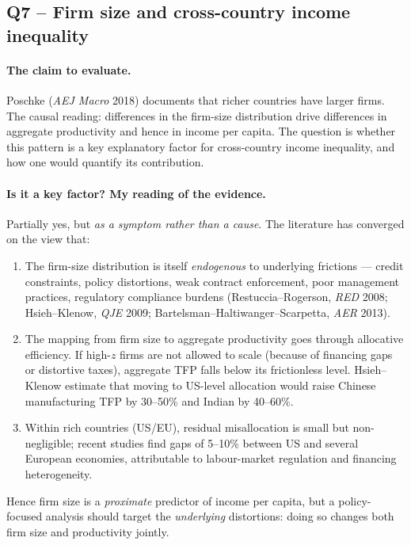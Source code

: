 \documentclass[11pt,a4paper]{article}
\begin{document}
\subsection*{Q7 -- Firm size and cross-country income inequality}

\paragraph{The claim to evaluate.}
Poschke (\emph{AEJ Macro} 2018) documents that richer countries have larger firms. The causal reading: differences in the firm-size distribution drive differences in aggregate productivity and hence in income per capita. The question is whether this pattern is a key explanatory factor for cross-country income inequality, and how one would quantify its contribution.

\paragraph{Is it a key factor? My reading of the evidence.}
Partially yes, but \emph{as a symptom rather than a cause}. The literature has converged on the view that:
\begin{enumerate}[leftmargin=*,itemsep=1pt]
    \item The firm-size distribution is itself \emph{endogenous} to underlying frictions --- credit constraints, policy distortions, weak contract enforcement, poor management practices, regulatory compliance burdens (Restuccia--Rogerson, \emph{RED} 2008; Hsieh--Klenow, \emph{QJE} 2009; Bartelsman--Haltiwanger--Scarpetta, \emph{AER} 2013).
    \item The mapping from firm size to aggregate productivity goes through allocative efficiency. If high-$z$ firms are not allowed to scale (because of financing gaps or distortive taxes), aggregate TFP falls below its frictionless level. Hsieh--Klenow estimate that moving to US-level allocation would raise Chinese manufacturing TFP by 30--50\% and Indian by 40--60\%.
    \item Within rich countries (US/EU), residual misallocation is small but non-negligible; recent studies find gaps of 5--10\% between US and several European economies, attributable to labour-market regulation and financing heterogeneity.
\end{enumerate}
Hence firm size is a \emph{proximate} predictor of income per capita, but a policy-focused analysis should target the \emph{underlying} distortions: doing so changes both firm size and productivity jointly.
\end{document}
